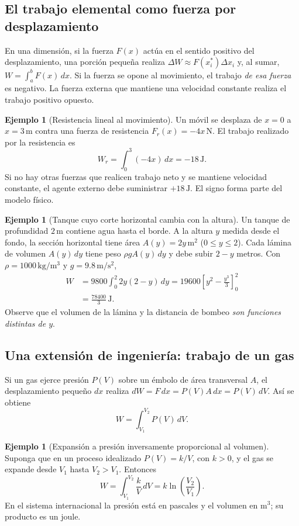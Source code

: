 \documentclass[12pt]{article}
\theoremstyle{definition}
\newtheorem{ejemplo}[teorema]{Ejemplo}
\theoremstyle{remark}
\begin{document}

\subsection*{El trabajo elemental como fuerza por desplazamiento}
En una dimensión, si la fuerza $F(x)$ actúa en el sentido positivo del desplazamiento, una porción pequeña realiza $\Delta W\approx F(x_i^*)\Delta x_i$ y, al sumar, $W=\int_a^b F(x)\,dx$. Si la fuerza se opone al movimiento, el trabajo \emph{de esa fuerza} es negativo. La fuerza externa que mantiene una velocidad constante realiza el trabajo positivo opuesto.
\begin{ejemplo}[Resistencia lineal al movimiento]
Un móvil se desplaza de $x=0$ a $x=3\,\mathrm m$ contra una fuerza de resistencia $F_r(x)=-4x\,\mathrm N$. El trabajo realizado por la resistencia es
\[
W_r=\int_0^3(-4x)\,dx=\boxed{-18\,\mathrm J}.
\]
Si no hay otras fuerzas que realicen trabajo neto y se mantiene velocidad constante, el agente externo debe suministrar $+18\,\mathrm J$. El signo forma parte del modelo físico.
\end{ejemplo}
\begin{ejemplo}[Tanque cuyo corte horizontal cambia con la altura]
Un tanque de profundidad $2\,\mathrm m$ contiene agua hasta el borde. A la altura $y$ medida desde el fondo, la sección horizontal tiene área $A(y)=2y\,\mathrm{m^2}$ ($0\le y\le2$). Cada lámina de volumen $A(y)\,dy$ tiene peso $\rho g A(y)\,dy$ y debe subir $2-y$ metros. Con $\rho=1000\,\mathrm{kg/m^3}$ y $g=9.8\,\mathrm{m/s^2}$,
\begin{align*}
W&=9800\int_0^2 2y(2-y)\,dy
=19600\left[y^2-\frac{y^3}{3}\right]_0^2\\
&=\boxed{\frac{78400}{3}\,\mathrm J}.
\end{align*}
Observe que el volumen de la lámina y la distancia de bombeo \emph{son funciones distintas de $y$}.
\end{ejemplo}
\subsection*{Una extensión de ingeniería: trabajo de un gas}
Si un gas ejerce presión $P(V)$ sobre un émbolo de área transversal $A$, el desplazamiento pequeño $dx$ realiza $dW=F\,dx=P(V)A\,dx=P(V)\,dV$. Así se obtiene
\[
\boxed{W=\int_{V_1}^{V_2}P(V)\,dV.}
\]
\begin{ejemplo}[Expansión a presión inversamente proporcional al volumen]
Suponga que en un proceso idealizado $P(V)=k/V$, con $k>0$, y el gas se expande desde $V_1$ hasta $V_2>V_1$. Entonces
\[
W=\int_{V_1}^{V_2}\frac{k}{V}\,dV
=\boxed{k\ln\!\left(\frac{V_2}{V_1}\right)}.
\]
En el sistema internacional la presión está en pascales y el volumen en $\mathrm{m^3}$; su producto es un joule.
\end{ejemplo}
\end{document}
